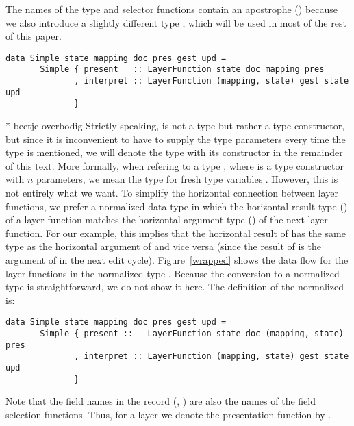 \bc The names of the type and selector functions contain an apostrophe () because we also introduce a slightly different type , which will be used in most of the rest of this paper.  \ec

\begin{small}
\begin{verbatim}
data Simple state mapping doc pres gest upd =
       Simple { present   :: LayerFunction state doc mapping pres
              , interpret :: LayerFunction (mapping, state) gest state upd
              }
\end{verbatim}
\end{small}


\bc ** beetje overbodig
Strictly speaking,  is not a type but rather a type constructor, but since it is inconvenient to have to supply the type parameters every time the type is mentioned, we will denote the type with its constructor in the remainder of this text. More formally, when refering to a type , where  is a type constructor with $n$ parameters, we mean the type  for fresh type variables .
\ec
However, this is not entirely what we want. To simplify the horizontal connection between layer functions, we prefer a normalized data type in which the horizontal result type () of a layer function matches the horizontal argument type () of the next layer function. For our example, this implies that the horizontal result of  has the same type as the horizontal argument of  and vice versa (since the result of  is the argument of  in the next edit cycle). Figure~\ref{wrapped} shows the data flow for the layer functions in the normalized type . Because the conversion to a normalized type is straightforward, we do not show it here. The definition of the normalized  is:

\begin{small}
\begin{verbatim}
data Simple state mapping doc pres gest upd =
       Simple { present ::   LayerFunction state doc (mapping, state) pres
              , interpret :: LayerFunction (mapping, state) gest state upd
              }
\end{verbatim}
\end{small}


Note that the field names in the record (, ) are also the names of the field selection functions. Thus, for a layer  we denote the presentation function by . 

